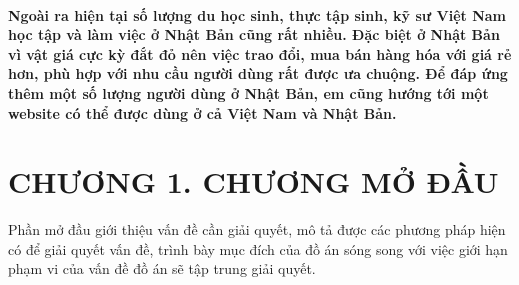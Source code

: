\documentclass{article}
\begin{document}
\paragraph{
Ngoài ra hiện tại số lượng du học sinh, thực tập sinh, kỹ sư Việt Nam học tập và làm việc ở Nhật Bản cũng rất nhiều. Đặc biệt ở Nhật Bản vì vật giá cực kỳ đắt đỏ nên việc trao đổi, mua bán hàng hóa với giá rẻ hơn, phù hợp với nhu cầu người dùng rất được ưa chuộng. Để đáp ứng thêm một số lượng người dùng ở Nhật Bản, em cũng hướng tới một website có thể được dùng ở cả Việt Nam và Nhật Bản.
}
\cleardoublepage

\section*{CHƯƠNG 1. CHƯƠNG MỞ ĐẦU}
Phần mở đầu giới thiệu vấn đề cần giải quyết, mô tả được các phương pháp hiện có để giải quyết vấn đề, trình bày mục đích của đồ án sóng song với việc giới hạn phạm vi của vấn đề đồ án sẽ tập trung giải quyết.
\end{document}
